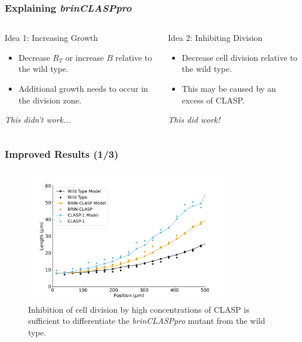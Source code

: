 \documentclass{beamer}
\begin{document}
\begin{frame}
\frametitle{Explaining \emph{brinCLASPpro}}
\begin{columns}
  \begin{column}{0.5\textwidth}
    Idea 1: Increasing Growth
    \begin{itemize}
      \item Decrease $R_{T}$ or increase $B$ relative to the wild type.
      \item Additional growth needs to occur in the division zone.
    \end{itemize}
    \bigskip
    \emph{This didn't work...}
  \end{column}
  \begin{column}{0.5\textwidth}
    Idea 2: Inhibiting Division
    \begin{itemize}
      \item Decrease cell division relative to the wild type. 
      \item This may be caused by an excess of CLASP.
    \end{itemize}
    \bigskip
    \emph{This did work!}
  \end{column}
\end{columns}
\end{frame}

\begin{frame}
\frametitle{Improved Results (1/3)}
\begin{figure}
  \centering
  \includegraphics[height=16em]{column-modified-fit.pdf}
  \caption{Inhibition of cell division by high concentrations of  CLASP is sufficient to differentiate the \emph{brinCLASPpro} mutant from the wild type.}
\end{figure}
\end{frame}
\end{document}
